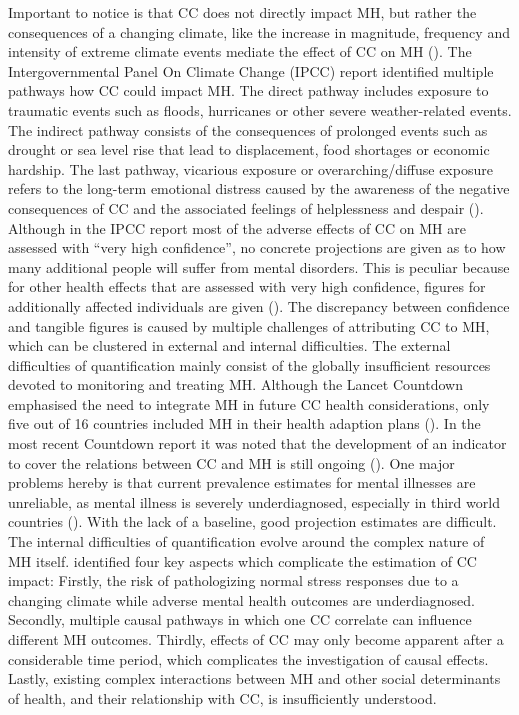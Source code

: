\documentclass[
]{krantz}
\begin{document}
Important to notice is that CC does not directly impact MH, but rather the consequences of a changing climate, like the increase in magnitude, frequency and intensity of extreme climate events mediate the effect of CC on MH (\citet{hayes2018}). The Intergovernmental Panel On Climate Change (IPCC) report identified multiple pathways how CC could impact MH. The direct pathway includes exposure to traumatic events such as floods, hurricanes or other severe weather-related events. The indirect pathway consists of the consequences of prolonged events such as drought or sea level rise that lead to displacement, food shortages or economic hardship. The last pathway, vicarious exposure or overarching/diffuse exposure refers to the long-term emotional distress caused by the awareness of the negative consequences of CC and the associated feelings of helplessness and despair (\citet{intergovernmentalpanelonclimatechange2023}).
Although in the IPCC report most of the adverse effects of CC on MH are assessed with ``very high confidence'', no concrete projections are given as to how many additional people will suffer from mental disorders. This is peculiar because for other health effects that are assessed with very high confidence, figures for additionally affected individuals are given (\citet{intergovernmentalpanelonclimatechange2023}).
The discrepancy between confidence and tangible figures is caused by multiple challenges of attributing CC to MH, which can be clustered in external and internal difficulties. The external difficulties of quantification mainly consist of the globally insufficient resources devoted to monitoring and treating MH. Although the Lancet Countdown emphasised the need to integrate MH in future CC health considerations, only five out of 16 countries included MH in their health adaption plans (\citet{watts2018}). In the most recent Countdown report it was noted that the development of an indicator to cover the relations between CC and MH is still ongoing (\citet{romanello2023}). One major problems hereby is that current prevalence estimates for mental illnesses are unreliable, as mental illness is severely underdiagnosed, especially in third world countries (\citet{worldhealthorganization2021}). With the lack of a baseline, good projection estimates are difficult.
The internal difficulties of quantification evolve around the complex nature of MH itself. \citet{hayes2018} identified four key aspects which complicate the estimation of CC impact: Firstly, the risk of pathologizing normal stress responses due to a changing climate while adverse mental health outcomes are underdiagnosed. Secondly, multiple causal pathways in which one CC correlate can influence different MH outcomes. Thirdly, effects of CC may only become apparent after a considerable time period, which complicates the investigation of causal effects. Lastly, existing complex interactions between MH and other social determinants of health, and their relationship with CC, is insufficiently understood.
\end{document}
